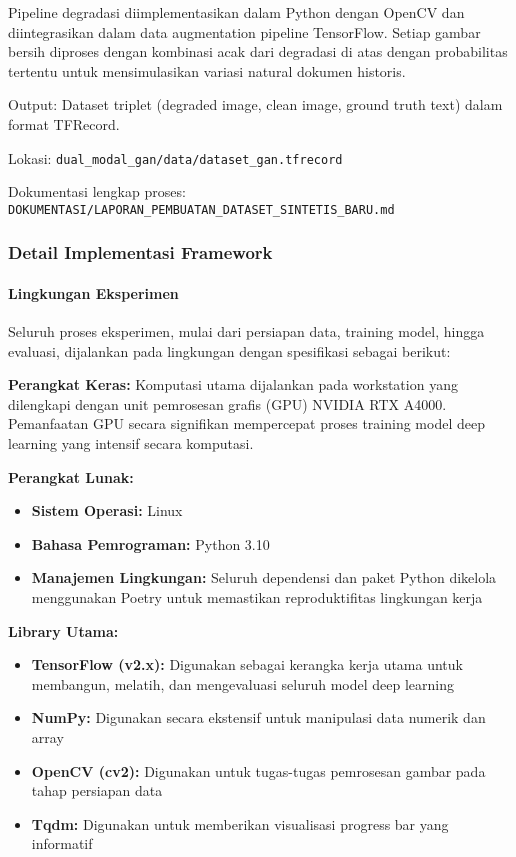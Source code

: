 \documentclass[12pt,a4paper]{article}
\begin{document}
Pipeline degradasi diimplementasikan dalam Python dengan OpenCV dan diintegrasikan dalam data augmentation pipeline TensorFlow. Setiap gambar bersih diproses dengan kombinasi acak dari degradasi di atas dengan probabilitas tertentu untuk mensimulasikan variasi natural dokumen historis.

Output: Dataset triplet (degraded image, clean image, ground truth text) dalam format TFRecord.

Lokasi: \texttt{dual\_modal\_gan/data/dataset\_gan.tfrecord}

Dokumentasi lengkap proses: \texttt{DOKUMENTASI/LAPORAN\_PEMBUATAN\_DATASET\_SINTETIS\_BARU.md}

\subsubsection{Detail Implementasi Framework}
\label{subsubsec:detail-implementasi}

\paragraph{Lingkungan Eksperimen}
Seluruh proses eksperimen, mulai dari persiapan data, training model, hingga evaluasi, dijalankan pada lingkungan dengan spesifikasi sebagai berikut:

\textbf{Perangkat Keras:}
Komputasi utama dijalankan pada workstation yang dilengkapi dengan unit pemrosesan grafis (GPU) NVIDIA RTX A4000. Pemanfaatan GPU secara signifikan mempercepat proses training model deep learning yang intensif secara komputasi.

\textbf{Perangkat Lunak:}
\begin{itemize}
    \item \textbf{Sistem Operasi:} Linux
    \item \textbf{Bahasa Pemrograman:} Python 3.10
    \item \textbf{Manajemen Lingkungan:} Seluruh dependensi dan paket Python dikelola menggunakan Poetry untuk memastikan reproduktifitas lingkungan kerja
\end{itemize}

\textbf{Library Utama:}
\begin{itemize}
    \item \textbf{TensorFlow (v2.x):} Digunakan sebagai kerangka kerja utama untuk membangun, melatih, dan mengevaluasi seluruh model deep learning
    \item \textbf{NumPy:} Digunakan secara ekstensif untuk manipulasi data numerik dan array
    \item \textbf{OpenCV (cv2):} Digunakan untuk tugas-tugas pemrosesan gambar pada tahap persiapan data
    \item \textbf{Tqdm:} Digunakan untuk memberikan visualisasi progress bar yang informatif
\end{itemize}
\end{document}
